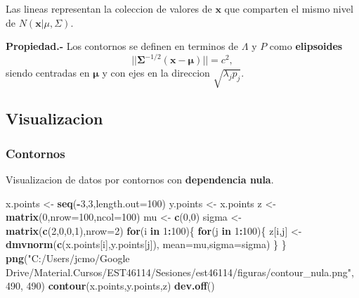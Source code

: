 \documentclass[11pt,]{article}
\newenvironment{Shaded}{\begin{snugshade}}{\end{snugshade}}
\newcommand{\KeywordTok}[1]{\textcolor[rgb]{0.13,0.29,0.53}{\textbf{#1}}}
\newcommand{\DataTypeTok}[1]{\textcolor[rgb]{0.13,0.29,0.53}{#1}}
\newcommand{\DecValTok}[1]{\textcolor[rgb]{0.00,0.00,0.81}{#1}}
\newcommand{\StringTok}[1]{\textcolor[rgb]{0.31,0.60,0.02}{#1}}
\newcommand{\ControlFlowTok}[1]{\textcolor[rgb]{0.13,0.29,0.53}{\textbf{#1}}}
\newcommand{\OperatorTok}[1]{\textcolor[rgb]{0.81,0.36,0.00}{\textbf{#1}}}
\newcommand{\NormalTok}[1]{#1}
\begin{document}
Las lineas representan la coleccion de valores de \(\boldsymbol{x}\) que
comparten el mismo nivel de \(N(\boldsymbol{x}|\mu,\Sigma)\).

\textbf{Propiedad.-} Los contornos se definen en terminos de \(\Lambda\)
y \(P\) como \textbf{elipsoides}
\[||\boldsymbol{\Sigma}^{-1/2}(\boldsymbol{x}-\boldsymbol{\mu})||=c^{2},\]
siendo centradas en \(\boldsymbol{\mu}\) y con ejes en la direccion
\(\sqrt{\lambda_j p_j}\).

\subsection{Visualizacion}\label{visualizacion-1}

\subsubsection{Contornos}\label{contornos-1}

Visualizacion de datos por contornos con \textbf{dependencia nula}.

\begin{Shaded}
\begin{Highlighting}[]
\NormalTok{x.points <-}\StringTok{ }\KeywordTok{seq}\NormalTok{(}\OperatorTok{-}\DecValTok{3}\NormalTok{,}\DecValTok{3}\NormalTok{,}\DataTypeTok{length.out=}\DecValTok{100}\NormalTok{)}
\NormalTok{y.points <-}\StringTok{ }\NormalTok{x.points}
\NormalTok{z <-}\StringTok{ }\KeywordTok{matrix}\NormalTok{(}\DecValTok{0}\NormalTok{,}\DataTypeTok{nrow=}\DecValTok{100}\NormalTok{,}\DataTypeTok{ncol=}\DecValTok{100}\NormalTok{)}
\NormalTok{mu <-}\StringTok{ }\KeywordTok{c}\NormalTok{(}\DecValTok{0}\NormalTok{,}\DecValTok{0}\NormalTok{)}
\NormalTok{sigma <-}\StringTok{ }\KeywordTok{matrix}\NormalTok{(}\KeywordTok{c}\NormalTok{(}\DecValTok{2}\NormalTok{,}\DecValTok{0}\NormalTok{,}\DecValTok{0}\NormalTok{,}\DecValTok{1}\NormalTok{),}\DataTypeTok{nrow=}\DecValTok{2}\NormalTok{)}
\ControlFlowTok{for}\NormalTok{(i }\ControlFlowTok{in} \DecValTok{1}\OperatorTok{:}\DecValTok{100}\NormalTok{)\{}
  \ControlFlowTok{for}\NormalTok{(j }\ControlFlowTok{in} \DecValTok{1}\OperatorTok{:}\DecValTok{100}\NormalTok{)\{}
\NormalTok{    z[i,j] <-}\StringTok{ }\KeywordTok{dmvnorm}\NormalTok{(}\KeywordTok{c}\NormalTok{(x.points[i],y.points[j]),}
                      \DataTypeTok{mean=}\NormalTok{mu,}\DataTypeTok{sigma=}\NormalTok{sigma)}
\NormalTok{    \}}
\NormalTok{\}}
\KeywordTok{png}\NormalTok{(}\StringTok{"C:/Users/jcmo/Google Drive/Material.Cursos/EST46114/Sesiones/est46114/figuras/contour_nula.png"}\NormalTok{, }\DecValTok{490}\NormalTok{, }\DecValTok{490}\NormalTok{)}
\KeywordTok{contour}\NormalTok{(x.points,y.points,z)}
\KeywordTok{dev.off}\NormalTok{()}
\end{Highlighting}
\end{Shaded}
\end{document}
